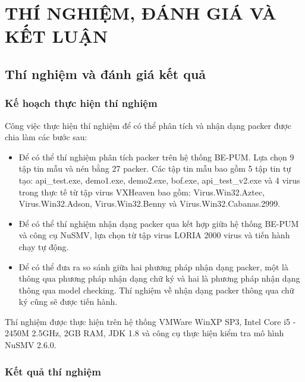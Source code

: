 
\newpage
\chapter{THÍ NGHIỆM, ĐÁNH GIÁ VÀ KẾT LUẬN}

\section{Thí nghiệm và đánh giá kết quả}

\subsection{Kế hoạch thực hiện thí nghiệm}

\hspace{0.5cm}Công việc thực hiện thí nghiệm để có thể phân tích và nhận dạng packer được chia làm các bước sau:

\begin{itemize}
\item{Để có thể thí nghiệm phân tích packer trên hệ thống BE-PUM. Lựa chọn 9 tập tin mẫu và nén bằng 27 packer. Các tập tin mẫu bao gồm 5 tập tin tự tạo: api\_test.exe, demo1.exe, demo2.exe, bof.exe, api\_test\_v2.exe và 4 virus trong thực tế từ tập virus VXHeaven bao gồm: Virus.Win32.Aztec, Virus.Win32.Adson, Virus.Win32.Benny và Virus.Win32.Cabanas.2999.\\}
\item{Để có thể thí nghiệm nhận dạng packer qua kết hợp giữa hệ thống BE-PUM và công cụ NuSMV, lựa chọn từ tập virus LORIA 2000 virus và tiến hành chạy tự động.\\} 
\item{Để có thể đưa ra so sánh giữa hai phương pháp nhận dạng packer, một là thông qua phương pháp nhận dạng chữ ký và hai là phương pháp nhận dạng thông qua model checking. Thí nghiệm về nhận dạng packer thông qua chữ ký cũng sẽ được tiến hành.}
\end{itemize}

\hspace{0.5cm}Thí nghiệm được thực hiện trên hệ thống VMWare WinXP SP3, Intel Core i5 - 2450M 2.5GHz, 2GB RAM, JDK 1.8 và công cụ thực hiện kiểm tra mô hình NuSMV 2.6.0.

\subsection{Kết quả thí nghiệm}

